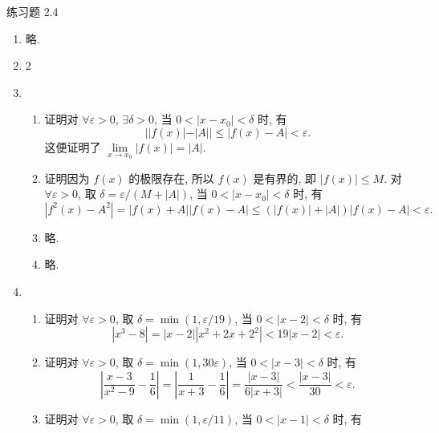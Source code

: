 \documentclass[12pt]{ctexart}
\begin{document}
\pagestyle{empty}

\begin{center}
    {\heiti 练习题 2.4}
\end{center}

\begin{enumerate}
    \item %
        略.
    \item 2
    \item %
        \begin{enumerate}[(1)]
            \item %
                {\heiti 证明}\quad 对 $\forall \varepsilon > 0$, $\exists \delta > 0$, 当 $0 < |x - x_0| < \delta$ 时, 有
                \[
                    ||f(x)| - |A|| \leqslant |f(x) - A| < \varepsilon.    
                \]
                这便证明了 $\lim\limits_{x\to x_0}|f(x)| = |A|$.
            \item %
                {\heiti 证明}\quad 因为 $f(x)$ 的极限存在, 所以 $f(x)$ 是有界的, 即 $|f(x)| \leqslant M$.
                对 $\forall \varepsilon > 0$, 取 $\delta = \varepsilon/(M + |A|)$, 当 $0 < |x - x_0| < \delta$ 时, 有
                \[
                    |f^2(x) - A^2| = |f(x) + A||f(x) - A| \leqslant (|f(x)| + |A|)|f(x) - A| < \varepsilon.
                \]
            \item %
                略.
            \item %
                略.
        \end{enumerate}
    \item %
        \begin{enumerate}[(1)]
            \item %
                {\heiti 证明}\quad 对 $\forall \varepsilon > 0$, 取 $\delta = \min(1, \varepsilon/19)$, 当 $0 < |x - 2| < \delta$ 时, 有
                \[
                    |x^3 - 8| = |x - 2||x^2 + 2x + 2^2| < 19|x - 2| < \varepsilon.   
                \]
            \item %
                {\heiti 证明}\quad 对 $\forall \varepsilon > 0$, 取 $\delta = \min(1, 30\varepsilon)$, 当 $0 < |x - 3| < \delta$ 时, 有
                \[
                    \left|\frac{x-3}{x^2-9} - \frac16\right| = \left|\frac{1}{x+3} - \frac16\right| = \frac{|x-3|}{6|x+3|} < \frac{|x-3|}{30} < \varepsilon.
                \]
            \item %
                {\heiti 证明}\quad 对 $\forall \varepsilon > 0$, 取 $\delta = \min(1, \varepsilon/11)$, 当 $0 < |x - 1| < \delta$ 时, 有

\end{enumerate}
\end{enumerate}
\end{document}
